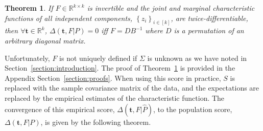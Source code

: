 \documentclass[letterpaper]{article}
\newtheorem{theorem}{Theorem}
\newcommand{\bas}[1]{\begin{align*}#1\end{align*}}
\newcommand{\bx}{\pmb{x}}
\newcommand{\bt}{\pmb{t}}
\newcommand{\E}{\mathbb{E}}
\newcommand{\bb}[1]{\left(#1\right)}
\newcommand{\bbb}[1]{\left[#1\right]}
\DeclareMathOperator{\diag}{diag}
\begin{document}
\begin{theorem}
\label{theorem:independence_score_correctness}
    If $F \in \mathbb{R}^{k \times k}$ is invertible and the joint and marginal characteristic functions of all independent components, $\left\{z_{i}\right\}_{i\in[k]}$, are twice-differentiable, then $\forall \bt \in \mathbb{R}^{k}$, $\Delta(\bt,F|P)=0$ \textit{iff} $F=DB^{-1}$ where $D$ is a permutation of an arbitrary diagonal matrix.
\end{theorem}
Unfortunately, $F$ is not uniquely defined if $\Sigma$ is unknown as we have noted in Section~\ref{section:introduction}.
The proof of Theorem~\ref{theorem:independence_score_correctness} is provided in the Appendix Section~\ref{section:proofs}. When using this score in practice, $S$ is replaced with the sample covariance matrix of the data, and the expectations are replaced by the empirical estimates of the characteristic function. The convergence of this empirical score, $\Delta(\mathbf{t},F|\hat{P})$, to the population score, $\Delta(\mathbf{t},F|P)$, is given by the following theorem.
\end{document}
